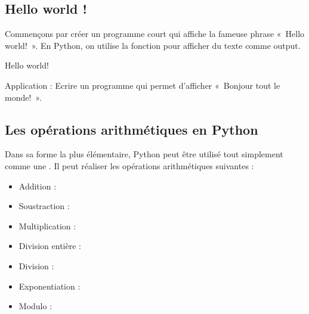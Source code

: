 \documentclass[letterpaper,10pt,french]{sphinxmanual}
\begin{document}
\subsection{Hello world !}
\label{\detokenize{ch1:hello-world}}
\sphinxAtStartPar
Commençons par créer un programme court qui affiche la fameuse phrase « Hello world! ».
En Python, on utilise la fonction  pour afficher du texte comme output.

\begin{sphinxVerbatim}[commandchars=\\\{\}]
\end{sphinxVerbatim}

\begin{sphinxVerbatim}[commandchars=\\\{\}]
Hello world!
\end{sphinxVerbatim}

\sphinxAtStartPar
Application : Ecrire un programme qui permet d’afficher « Bonjour tout le monde! ».

\begin{sphinxVerbatim}[commandchars=\\\{\}]
\end{sphinxVerbatim}


\subsection{Les opérations arithmétiques en Python}
\label{\detokenize{ch1:les-operations-arithmetiques-en-python}}
\sphinxAtStartPar
Dans sa forme la plus élémentaire, Python peut être utilisé tout simplement comme une . Il peut réaliser les opérations arithmétiques suivantes :
\begin{itemize}
\item {} 
\sphinxAtStartPar
Addition : \sphinxcode{\sphinxupquote{+}}

\item {} 
\sphinxAtStartPar
Soustraction : \sphinxcode{\sphinxupquote{\sphinxhyphen{}}}

\item {} 
\sphinxAtStartPar
Multiplication : \sphinxcode{\sphinxupquote{*}}

\item {} 
\sphinxAtStartPar
Division entière : \sphinxcode{\sphinxupquote{//}}

\item {} 
\sphinxAtStartPar
Division : \sphinxcode{\sphinxupquote{/}}

\item {} 
\sphinxAtStartPar
Exponentiation : \sphinxcode{\sphinxupquote{**}}

\item {} 
\sphinxAtStartPar
Modulo : \sphinxcode{\sphinxupquote{\%}}

\end{itemize}
\end{document}
